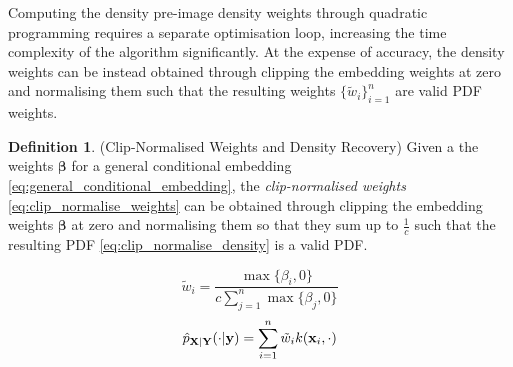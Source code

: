 \documentclass[twoside]{article} \usepackage{aistats2017}
\theoremstyle{definition}
\newtheorem{definition}{Definition}[section]
\theoremstyle{theorem}
\begin{document}
		Computing the density pre-image density weights through quadratic programming requires a separate optimisation loop, increasing the time complexity of the algorithm significantly. At the expense of accuracy, the density weights can be instead obtained through clipping the embedding weights at zero and normalising them such that the resulting weights $\{\tilde{w}_{i}\}_{i = 1}^{n}$ are valid PDF weights.

		\begin{definition} \label{def:clip_normalise}
		(Clip-Normalised Weights and Density Recovery)
		Given a the weights $\bm{\beta}$ for a general conditional embedding \eqref{eq:general_conditional_embedding}, the \textit{clip-normalised weights} \eqref{eq:clip_normalise_weights} can be obtained through clipping the embedding weights $\bm{\beta}$ at zero and normalising them so that they sum up to $\frac{1}{c}$ such that the resulting PDF \eqref{eq:clip_normalise_density} is a valid PDF.

			\begin{equation}
				\tilde{w}_{i} = \frac{\max\{\beta_{i}, 0\}}{c \sum_{j = 1}^{n} \max\{\beta_{j}, 0\}}
			\label{eq:clip_normalise_weights}
			\end{equation}
			\begin{equation}
				\hat{p}_{\mathbf{X} | \mathbf{Y}}(\cdot | \mathbf{y}) = \sum_{i = 1}^{n} \tilde{w}_{i} k(\mathbf{x}_{i}, \cdot)
			\label{eq:clip_normalise_density}
			\end{equation}
		\end{definition}
			
\end{document}
